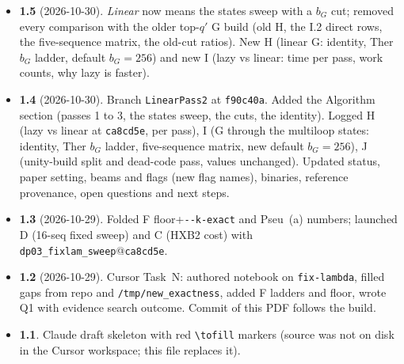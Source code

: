 \documentclass[11pt]{article}
\begin{document}
\begin{itemize}[leftmargin=*]
  \item \textbf{1.5} (2026-10-30). \emph{Linear} now means the states sweep with a $b_G$ cut; removed every comparison with the older top-$q'$ G build (old H, the I.2 direct rows, the five-sequence matrix, the old-cut ratios). New H (linear G: identity, Ther $b_G$ ladder, default $b_G=256$) and new I (lazy vs linear: time per pass, work counts, why lazy is faster).
  \item \textbf{1.4} (2026-10-30). Branch \texttt{LinearPass2} at \texttt{f90c40a}. Added the Algorithm section (passes 1 to 3, the states sweep, the cuts, the identity). Logged H (lazy vs linear at \texttt{ca8cd5e}, per pass), I (G through the multiloop states: identity, Ther $b_G$ ladder, five-sequence matrix, new default $b_G=256$), J (unity-build split and dead-code pass, values unchanged). Updated status, paper setting, beams and flags (new flag names), binaries, reference provenance, open questions and next steps.
  \item \textbf{1.3} (2026-10-29). Folded F floor+\texttt{-{}-k-exact} and Pseu~(a) numbers; launched D (16-seq fixed sweep) and C (HXB2 cost) with \texttt{dp03\_fixlam\_sweep}@\texttt{ca8cd5e}.
  \item \textbf{1.2} (2026-10-29). Cursor Task~N: authored notebook on \texttt{fix-lambda}, filled gaps from repo and \texttt{/tmp/new\_exactness}, added F ladders and floor, wrote Q1 with evidence search outcome. Commit of this PDF follows the build.
  \item \textbf{1.1}. Claude draft skeleton with red \texttt{\textbackslash tofill} markers (source was not on disk in the Cursor workspace; this file replaces it).
\end{itemize}
\end{document}
